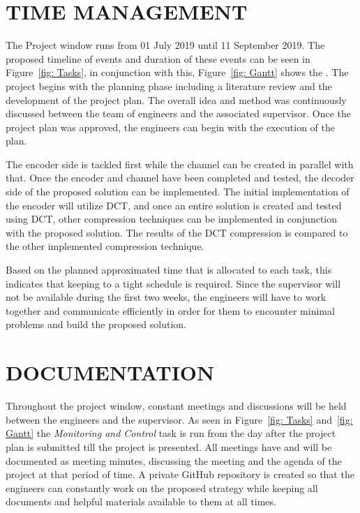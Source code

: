 \documentclass[10pt,twocolumn, a4paper]{witseiepaper}
\begin{document}
%
\section{TIME MANAGEMENT}
\label{sec: Time Management}
The Project window runs from 01 July 2019 until 11 September 2019. The proposed timeline of events and duration of these events can be seen in Figure~\ref{fig: Tasks}, in conjunction with this, Figure~\ref{fig: Gantt} shows the . The project begins with the planning phase including a literature review and the development of the project plan. The overall idea and method was continuously discussed between the team of engineers and the associated supervisor. Once the project plan was approved, the engineers can begin with the execution of the plan.

The encoder side is tackled first while the channel can be created in parallel with that. Once the encoder and channel have been completed and tested, the decoder side of the proposed solution can be implemented. The initial implementation of the encoder will utilize DCT, and once an entire solution is created and tested using DCT, other compression techniques can be implemented in conjunction with the proposed solution. The results of the DCT compression is compared to the other implemented compression technique.

Based on the planned approximated time that is allocated to each task, this indicates that keeping to a tight schedule is required. Since the supervisor will not be available during the first two weeks, the engineers will have to work together and communicate efficiently in order for them to encounter minimal problems and build the proposed solution.

%
\section{DOCUMENTATION}
\label{sec: Documentation}
Throughout the project window, constant meetings and discussions will be held between the engineers and the supervisor. As seen in Figure~\ref{fig: Tasks} and~\ref{fig: Gantt} the \emph{Monitoring and Control} task is run from the day after the project plan is submitted till the project is presented. All meetings have and will be documented as meeting minutes, discussing the meeting and the agenda of the project at that period of time. A private GitHub repository is created so that the engineers can constantly work on the proposed strategy while keeping all documents and helpful materials available to them at all times.
\end{document}
